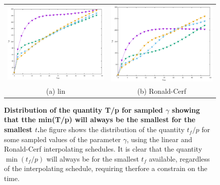         \begin{figure}[ht]
        \centering
        \begin{tabular}{cc}
          \includegraphics[width=75mm]{./figures/sampled_t_over_p/T_p_lin.pdf} &   \includegraphics[width=75mm]{./figures/sampled_t_over_p/T_p_cerf.pdf} \\
        (a) lin & (b) Ronald-Cerf\\[6pt]
        \end{tabular}
        \caption[$t_f/p$ distribution for sampled $\gamma$ showing that the minimum will always be for the smallest $t$ ]{\textbf{Distribution of the quantity T/p for sampled $\gamma$ showing that tthe min(T/p) will always be the smallest for the smallest $t$.}he figure shows the distribution of the quantity $t_f/p$ for some sampled values of the parameter $\gamma$, using the linear and Ronald-Cerf interpolating schedules. It is clear that the quantity $\min(t_f/p)$ will always be for the smallest $t_f$ available, regardless of the interpolating schedule, requiring therfore a constrain on the time.}
        \end{figure}

